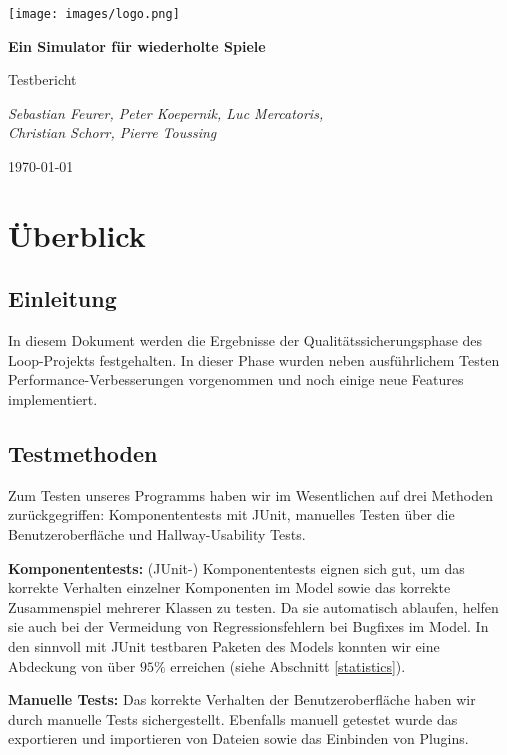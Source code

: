 \documentclass[parskip=full,11pt,openany]{scrreprt}
\begin{document}
\begin{titlepage}
	\centering
	\vspace*{5cm}
	\texttt{[image: images/logo.png]}\par
	{\huge\bfseries Ein Simulator für wiederholte Spiele\par}
	{\Large Testbericht\par}
	\vspace{2cm}
	{\Large\itshape Sebastian Feurer, Peter Koepernik, Luc Mercatoris,\\Christian Schorr, Pierre Toussing\par}
	\vfill
	{\large \today\par}
\end{titlepage}

\tableofcontents
\pagebreak

\chapter{Überblick}

\section{Einleitung}

In diesem Dokument werden die Ergebnisse der Qualitätssicherungsphase des Loop-Projekts festgehalten.
In dieser Phase wurden neben ausführlichem Testen Performance-Verbesserungen vorgenommen und noch einige neue Features implementiert.

\section{Testmethoden}

Zum Testen unseres Programms haben wir im Wesentlichen auf drei Methoden zurückgegriffen: Komponententests mit JUnit, manuelles Testen über die Benutzeroberfläche und Hallway-Usability Tests.

\textbf{Komponententests:} (JUnit-) Komponententests eignen sich gut, um das korrekte Verhalten einzelner Komponenten im Model sowie das korrekte Zusammenspiel mehrerer Klassen zu testen. Da sie automatisch ablaufen, helfen sie auch bei der Vermeidung von Regressionsfehlern bei Bugfixes im Model. In den sinnvoll mit JUnit testbaren Paketen des Models konnten wir eine Abdeckung von über \(95\%\) erreichen (siehe Abschnitt \ref{statistics}).

\textbf{Manuelle Tests: } Das korrekte Verhalten der Benutzeroberfläche haben wir durch manuelle Tests sichergestellt. Ebenfalls manuell getestet wurde das exportieren und importieren von Dateien sowie das Einbinden von Plugins.
\end{document}
